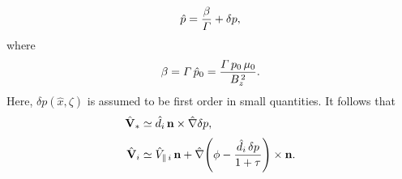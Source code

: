 \documentclass[notitlepage,12pt]{article}
\begin{document}
\begin{equation}
\hat{p}= \frac{\beta}{{\mit\Gamma}} + \delta p,
\end{equation}
where 
\begin{equation}\label{e244}
\beta= {\mit\Gamma}\,\hat{p}_0= \frac{{\mit\Gamma}\,p_0\,\mu_0}{B_z^{\,2}}.
\end{equation}
 Here, $\delta p(\hat{x},\zeta)$ is assumed to be first order in small
quantities. 
It follows that
\begin{align}
\hat{\bf V}_\ast &\simeq \hat{d}_i\,{\bf n}\times \hat{\nabla} \delta p,\\[0.5ex]
\hat{\bf V}_i&\simeq  \hat{V}_{\parallel\,i} \,{\bf n}+ \hat{\nabla}\!\left(\phi - \frac{\hat{d}_i\,\delta p}{1+\tau}\right)\times {\bf n}.
\end{align}
\end{document}
